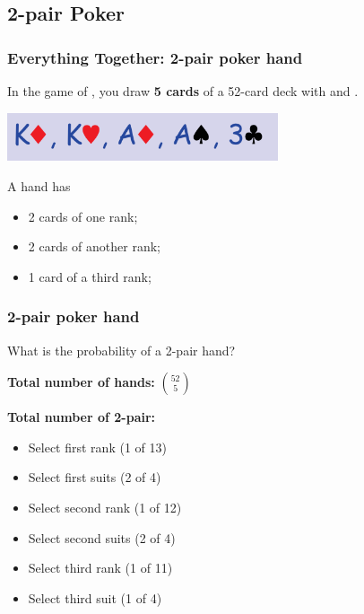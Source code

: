 \documentclass{beamer}
\begin{document}
\subsection{2-pair Poker}

\begin{frame}
  \frametitle{Everything Together: 2-pair poker hand}

  {\larger

    In the game of , you draw {\bf 5 cards} of a
    52-card deck with  and .

    \bigskip

    \begin{center}
      \includegraphics[width=0.6\textwidth]{../img/poker1}
    \end{center}
    
    A  hand has
    \begin{itemize}
    \item 2 cards of one rank;
    \item 2 cards of another rank;
    \item 1 card of a third rank;
    \end{itemize}
  }
\end{frame}

\begin{frame}
  \frametitle{2-pair poker hand}

  {\larger
    What is the probability of a 2-pair hand?

    \bigskip
    
    {\bf Total number of hands:} $\binom{52}{5}$

    \bigskip
    
    {\bf Total number of 2-pair:}
    \begin{itemize}
    \item Select first rank (1 of 13)
    \item Select first suits (2 of 4)
    \item Select second rank (1 of 12)
    \item Select second suits (2 of 4)
    \item Select third rank (1 of 11)
    \item Select third suit (1 of 4)
    \end{itemize}
  }
\end{frame}
\end{document}
